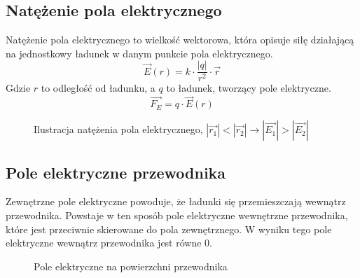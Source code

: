 \documentclass{../notatki}
\begin{document}
\subsection{Natężenie pola elektrycznego}

Natężenie pola elektrycznego to wielkość wektorowa, która opisuje siłę
działającą na jednostkowy ładunek w danym punkcie pola elektrycznego.
$$
\vec{E}(r) = k \cdot \frac{|q|}{r^2} \cdot \vec{r}
$$
Gdzie $r$ to odległość od ładunku, a $q$ to ładunek, tworzący pole
elektryczne.
$$
\vec{F_E} = q \cdot \vec{E}(r)
$$

\begin{figure*}[h]
  \centering
  \caption{Ilustracja natężenia pola elektrycznego, $|\vec{r_1}| <
  |\vec{r_2}| \rightarrow |\vec{E_1}| > |\vec{E_2}|$}
\end{figure*}

\subsection{Pole elektryczne przewodnika}

Zewnętrzne pole elektryczne powoduje, że ładunki się przemieszczają wewnątrz
przewodnika. Powstaje w ten sposób pole elektryczne wewnętrzne
przewodnika, które
jest przeciwnie skierowane do pola zewnętrznego. W wyniku tego pole elektryczne
wewnątrz przewodnika jest równe 0.

\begin{figure}[h]
  \centering
  \caption{Pole elektryczne na powierzchni przewodnika}
\end{figure}
\end{document}
